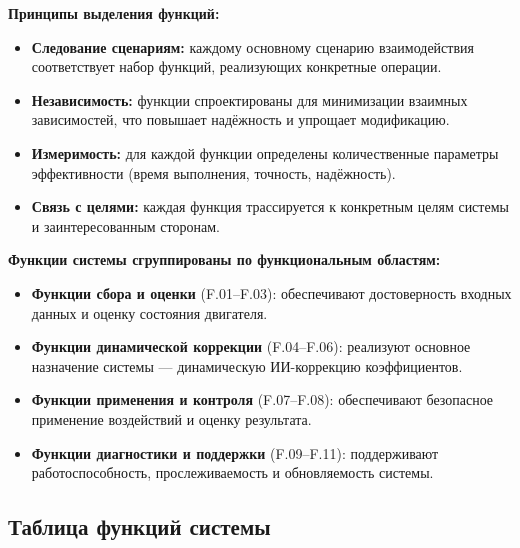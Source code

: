 \documentclass[14pt, a4paper]{extarticle}
\begin{document}
					\textbf{Принципы выделения функций:}
					\begin{itemize}
						\item \textbf{Следование сценариям:} каждому основному сценарию взаимодействия соответствует набор функций, реализующих конкретные операции.
						\item \textbf{Независимость:} функции спроектированы для минимизации взаимных зависимостей, что повышает надёжность и упрощает модификацию.
						\item \textbf{Измеримость:} для каждой функции определены количественные параметры эффективности (время выполнения, точность, надёжность).
						\item \textbf{Связь с целями:} каждая функция трассируется к конкретным целям системы и заинтересованным сторонам.
					\end{itemize}
					
					\textbf{Функции системы сгруппированы по функциональным областям:}
					\begin{itemize}
						\item \textbf{Функции сбора и оценки} (F.01–F.03): обеспечивают достоверность входных данных и оценку состояния двигателя.
						\item \textbf{Функции динамической коррекции} (F.04–F.06): реализуют основное назначение системы — динамическую ИИ-коррекцию коэффициентов.
						\item \textbf{Функции применения и контроля} (F.07–F.08): обеспечивают безопасное применение воздействий и оценку результата.
						\item \textbf{Функции диагностики и поддержки} (F.09–F.11): поддерживают работоспособность, прослеживаемость и обновляемость системы.
					\end{itemize}
					
					\subsection{Таблица функций системы}
					
\end{document}
